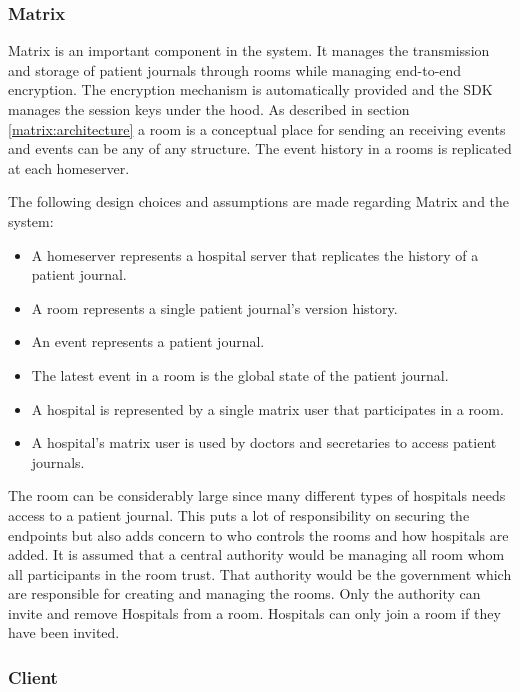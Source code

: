 \subsubsection{Matrix}
Matrix is an important component in the system. It manages the transmission and storage of patient journals through rooms while managing end-to-end encryption. The encryption mechanism is automatically provided and the SDK manages the session keys under the hood.  As described in section \ref{matrix:architecture} a room is a conceptual place for sending an receiving events and events can be any of any structure. The event history in a rooms is replicated at each homeserver. 

The following design choices and assumptions are made regarding Matrix and the system: 

\begin{itemize}
	\item A homeserver represents a hospital server that replicates the history of a patient journal. 
	\item A room represents a single patient journal's version history.
	\item An event represents a patient journal.  
	\item The latest event in a room is the global state of the patient journal.
	\item A hospital is represented by a single matrix user that participates in a room.
	\item A hospital's matrix user is used by doctors and secretaries to access patient journals. 
\end{itemize}


The room can be considerably large since many different types of hospitals needs access to a patient journal. This puts a lot of responsibility on securing the endpoints but also adds concern to who controls the rooms and how hospitals are added. It is assumed that a central authority would be managing all room whom all participants in the room trust. That authority would be the government which are responsible for creating and managing the rooms. Only the authority can invite and remove Hospitals from a room. Hospitals can only join a room if they have been invited.


\subsubsection{Client}

